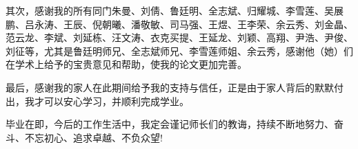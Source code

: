 \documentclass[nomlist,masters,openany]{seuthesix}
\begin{document}
其次，感谢我的所有同门朱曼、刘倩、鲁廷明、全志斌、归耀城、李雪莲、吴展鹏、吕永涛、王辰、倪朝曦、潘敬敏、司马强、王煜、王李荣、余云秀、刘金晶、范云龙、李斌、刘延栋、汪文涛、衣克买提、王延龙、刘颖、高翔、尹浩、尹俊、刘征等，尤其是鲁廷明师兄、全志斌师兄、李雪莲师姐、余云秀，感谢他（她）们在学术上给予的宝贵意见和帮助，使我的论文更加完善。

最后，感谢我的家人在此期间给予我的支持与信任，正是由于家人背后的默默付出，我才可以安心学习，并顺利完成学业。

毕业在即，今后的工作生活中，我定会谨记师长们的教诲，持续不断地努力、奋斗、不忘初心、追求卓越、不负众望!

\quad

\quad




\appendix

\end{document}

